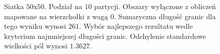 \begin{figure}[h]
\begin{subfigure}{.33\textwidth}
    \caption[short]{}
\end{subfigure}
\caption{Siatka $50$x$50$. Podział na $10$ partycji.
Obszary wyłączone z obliczeń mapowane na wierzchołki z wagą $0$.
Sumaryczna długość granic dla tego wyniku wynosi $261$.
Wybór najlepszego rezultatu wedle kryterium najmniejszej długości granic.
Odchylenie standardowe wielkości pól wynosi $1.3627$.}
\label{result:12}
\end{figure}
\FloatBarrier
\begin{figure}[h]
\centering
\begin{subfigure}{.33\textwidth}
    \centering
    \caption[short]{}
\end{subfigure}%
\begin{subfigure}{.33\textwidth}
    \centering
    \caption[short]{}
\end{subfigure}%
\begin{subfigure}{.33\textwidth}

\end{subfigure}
\end{figure}
